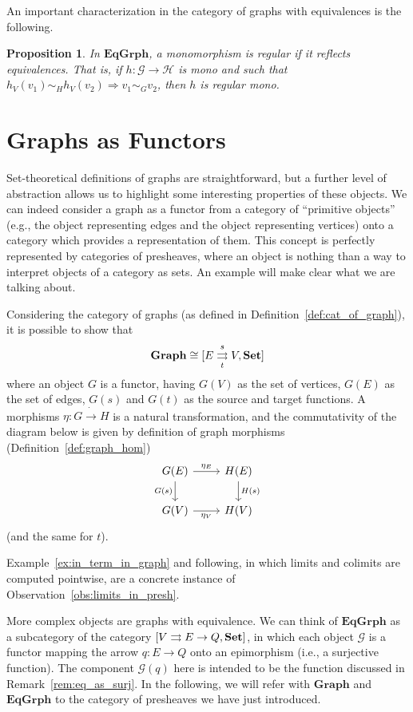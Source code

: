 \documentclass[a4paper, twoside,openright]{report}
\theoremstyle{plain}
\newtheorem{prop}[theorem]{Proposition}
\theoremstyle{definition}
\begin{document}
An important characterization in the category of graphs with equivalences is the following.

\begin{prop}\label{prop:reg_mono_in_EG_are_mono_in_graph}
    In $\mathbf{EqGrph}$, a monomorphism is regular if it reflects equivalences. That is, if $h: \mathcal{G \rightarrow H}$ is mono and such that $h_V (v_1) \sim_H h_V(v_2) \Rightarrow v_1 \sim_G v_2$, then $h$ is regular mono.
\end{prop}


\section{Graphs as Functors}

Set-theoretical definitions of graphs are straightforward, but a further level of abstraction allows us to highlight some interesting properties of these objects. We can indeed consider a graph as a functor from a category of ``primitive objects'' (e.g., the object representing edges and the object representing vertices) onto a category which provides a representation of them. This concept is perfectly represented by categories of presheaves, where an object is nothing than a way to interpret objects of a category as sets. An example will make clear what we are talking about.

Considering the category of graphs (as defined in Definition~\ref{def:cat_of_graph}), it is possible to show that 
$$\mathbf{Graph} \cong [E \mathrel{\mathop{\rightrightarrows}^{s}_{t}} V , \mathbf{Set}]$$
where an object $G$ is a functor, having $G(V)$ as the set of vertices, $G(E)$ as the set of edges, $G(s)$ and $G(t)$ as the source and target functions. A morphisms $\eta: G \dot\rightarrow H$ is a natural transformation, and the commutativity of the diagram below is given by definition of graph morphisms (Definition~\ref{def:graph_hom})
$$
    \begin{tikzcd}
        G(E) \arrow[r, "{\eta_E}"] \arrow[d, "G(s)"swap] & H(E) \arrow[d, "H(s)"] \\
        G(V) \arrow[r, "{\eta_V}"swap] & H(V)
    \end{tikzcd}
$$
(and the same for $t$).

Example~\ref{ex:in_term_in_graph} and following, in which limits and colimits are computed pointwise, are a concrete instance of Observation~\ref{obs:limits_in_presh}.

More complex objects are graphs with equivalence. We can think of $\mathbf{EqGrph}$ as a subcategory of the category $[V \rightrightarrows E \rightarrow Q, \mathbf{Set}]$, in which each object $\mathcal{G}$ is a functor mapping the arrow $q: E \rightarrow Q$ onto an epimorphism (i.e., a surjective function). The component $\mathcal{G}(q)$ here is intended to be the function discussed in Remark~\ref{rem:eq_as_surj}. 
In the following, we will refer with $\mathbf{Graph}$ and $\mathbf{EqGrph}$ to the category of presheaves we have just introduced.
\end{document}
